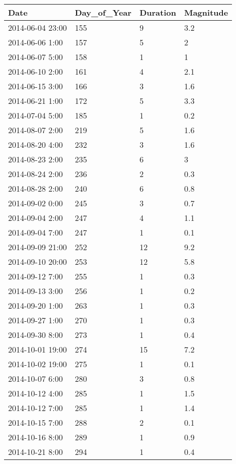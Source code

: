 \documentclass[
]{article}
\begin{document}
\begin{tabular}{l|l|l|l}
\hline
Date & Day\_of\_Year & Duration & Magnitude\\
\hline
2014-06-04 23:00 & 155 & 9 & 3.2\\
\hline
2014-06-06 1:00 & 157 & 5 & 2\\
\hline
2014-06-07 5:00 & 158 & 1 & 1\\
\hline
2014-06-10 2:00 & 161 & 4 & 2.1\\
\hline
2014-06-15 3:00 & 166 & 3 & 1.6\\
\hline
2014-06-21 1:00 & 172 & 5 & 3.3\\
\hline
2014-07-04 5:00 & 185 & 1 & 0.2\\
\hline
2014-08-07 2:00 & 219 & 5 & 1.6\\
\hline
2014-08-20 4:00 & 232 & 3 & 1.6\\
\hline
2014-08-23 2:00 & 235 & 6 & 3\\
\hline
2014-08-24 2:00 & 236 & 2 & 0.3\\
\hline
2014-08-28 2:00 & 240 & 6 & 0.8\\
\hline
2014-09-02 0:00 & 245 & 3 & 0.7\\
\hline
2014-09-04 2:00 & 247 & 4 & 1.1\\
\hline
2014-09-04 7:00 & 247 & 1 & 0.1\\
\hline
2014-09-09 21:00 & 252 & 12 & 9.2\\
\hline
2014-09-10 20:00 & 253 & 12 & 5.8\\
\hline
2014-09-12 7:00 & 255 & 1 & 0.3\\
\hline
2014-09-13 3:00 & 256 & 1 & 0.2\\
\hline
2014-09-20 1:00 & 263 & 1 & 0.3\\
\hline
2014-09-27 1:00 & 270 & 1 & 0.3\\
\hline
2014-09-30 8:00 & 273 & 1 & 0.4\\
\hline
2014-10-01 19:00 & 274 & 15 & 7.2\\
\hline
2014-10-02 19:00 & 275 & 1 & 0.1\\
\hline
2014-10-07 6:00 & 280 & 3 & 0.8\\
\hline
2014-10-12 4:00 & 285 & 1 & 1.5\\
\hline
2014-10-12 7:00 & 285 & 1 & 1.4\\
\hline
2014-10-15 7:00 & 288 & 2 & 0.1\\
\hline
2014-10-16 8:00 & 289 & 1 & 0.9\\
\hline
2014-10-21 8:00 & 294 & 1 & 0.4\\
\hline
\end{tabular}
\end{document}
